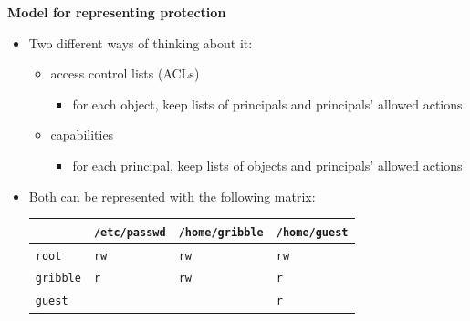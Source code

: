 \documentclass[11pt,a4paper]{article}
\begin{document}
\textbf{Model for representing protection}
\begin{itemize}
    \item Two different ways of thinking about it:
        \begin{itemize}
            \item access control lists (ACLs)
                \begin{itemize}
                    \item for each object, keep lists of principals and principals' allowed
                        actions
                \end{itemize}
            \item capabilities
                \begin{itemize}
                    \item for each principal, keep lists of objects and principals' allowed
                        actions
                \end{itemize}
        \end{itemize}
    \item Both can be represented with the following matrix: \\
        \begin{tabular}{l l l l}
            \toprule
                             & \texttt{/etc/passwd} & \texttt{/home/gribble} & \texttt{/home/guest} \\
                             \midrule
            \texttt{root}    & \texttt{rw}          & \texttt{rw}            & \texttt{rw} \\
            \texttt{gribble} & \texttt{r}           & \texttt{rw}            & \texttt{r} \\
            \texttt{guest}   &                      &                        & \texttt{r} \\
            \bottomrule
        \end{tabular}
\end{itemize}
\end{document}
